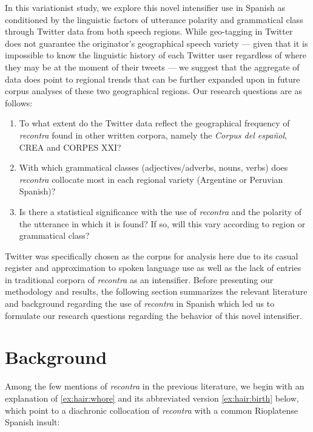 \documentclass[output=paper,colorlinks,citecolor=brown,
]{langscibook}
\begin{document}
In this variationist study, we explore this novel intensifier use in Spanish as conditioned by the linguistic factors of utterance polarity and grammatical class through Twitter data from both speech regions. While geo-tagging in Twitter does not guarantee the originator's geographical speech variety — given that it is impossible to know the linguistic history of each Twitter user regardless of where they may be at the moment of their tweets — we suggest that the aggregate of data does point to regional trends that can be further expanded upon in future corpus analyses of these two geographical regions. Our research questions are as follows: 

\begin{enumerate}
    \item To what extent do the Twitter data reflect the geographical frequency of \textit{recontra} found in other written corpora, namely the \textit{Corpus del español}, CREA and CORPES XXI? 
    \item With which grammatical classes (adjectives/adverbs, nouns, verbs) does \textit{recontra} collocate most in each regional variety (Argentine or Peruvian Spanish)? 
    \item Is there a statistical significance with the use of \textit{recontra} and the polarity of the utterance in which it is found? If so, will this vary according to region or grammatical class? 
\end{enumerate}


Twitter was specifically chosen as the corpus for analysis here due to its casual register and approximation to spoken language use as well as the lack of entries in traditional corpora of \textit{recontra} as an intensifier. Before presenting our methodology and results, the following section summarizes the relevant literature and background regarding the use of \textit{recontra} in Spanish which led us to formulate our research questions regarding the behavior of this novel intensifier. 

\section{Background}\label{sec:hair:2}

Among the few mentions of \textit{recontra} in the previous literature, we begin with an explanation of \ref{ex:hair:whore} and its abbreviated version \ref{ex:hair:birth} below, which point to a diachronic collocation of \textit{recontra} with a common Rioplatense Spanish insult: 
\end{document}
